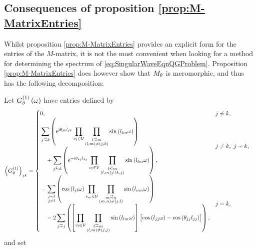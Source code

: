 \subsection{Consequences of proposition \ref{prop:M-MatrixEntries}} \label{ssec:MMatrixConsequences}
Whilst proposition \ref{prop:M-MatrixEntries} provides an explicit form for the entries of the $M$-matrix,  it is not the most convenient when looking for a method for determining the spectrum of \eqref{eq:SingularWaveEqnQGProblem}.
Proposition \ref{prop:M-MatrixEntries} does however show that $M_\theta$ is meromorphic, and thus has the following decomposition:
\begin{cory} \label{cory:M-MatrixEntriesNoPoles}
	Let $G^{(1)}_\theta\left( \omega \right)$ have entries defined by
	\begin{align*}
		\bracs{G^{(1)}_\qm}_{jk} &= 
		\begin{cases}
			\!\begin{aligned}
				&0,
			\end{aligned}			
			& j \not\con k, \\
			\!\begin{aligned}
				&\sum_{j\conLeft k} \bracs{ \e^{\rmi\qm_{jk}l_{jk}} \prod_{v_l\in\vertSet}\prod_{\substack{ l\conLeft m \\ \bracs{l,m} \neq \bracs{j,k} }}\sin\bracs{l_{lm}\omega} }
				\\ &\quad + \sum_{j\conRight k} \bracs{ \e^{-\rmi\qm_{kj}l_{kj}} \prod_{v_l\in\vertSet}\prod_{\substack{l\conLeft m \\ \bracs{l,m} \neq \bracs{k,j} }}\sin\bracs{l_{lm}\omega} },
			\end{aligned}
			& j\neq k, \ j\con k, \\
			\!\begin{aligned}
				&- \sum_{\substack{j\con l \\ j\neq l}} \bracs{ \cos\bracs{l_{jl}\omega}\prod_{v_m\in\vertSet}\prod_{\substack{ m\conLeft n \\ \bracs{m,n}\neq\bracs{j,l} }}\sin\bracs{l_{mn}\omega} }
				\\ &\quad - 2\sum_{j\conLeft j} \bracs{ \sqbracs{ \prod_{v_l\in\vertSet}\prod_{\substack{l\conLeft m \\ \bracs{l,m}\neq\bracs{j,j} }}\sin\bracs{l_{lm}\omega} }\bigl[ \cos\bracs{l_{jj}\omega} - \cos\bracs{\qm_{jj}l_{jj}} \bigr] },
			\end{aligned}
			& j=k,
		\end{cases}
	\end{align*}
	and set
	\begin{align*}

\end{align*}
\end{cory}
